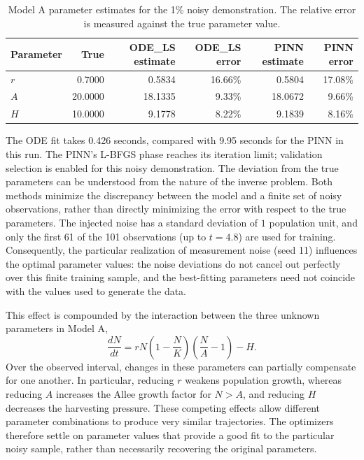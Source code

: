 \begin{table}[ht]
\centering
\caption{Model A parameter estimates for the 1\% noisy demonstration. The
relative error is measured against the true parameter value.}
\label{tab:wp05_noisy_demo}
\small
\begin{tabular}{lrrrrr}
\toprule
\textbf{Parameter} & \textbf{True} & \textbf{ODE\_LS estimate} & \textbf{ODE\_LS error} & \textbf{PINN estimate} & \textbf{PINN error}\\
\midrule
$r$ & 0.7000 & 0.5834 & 16.66\% & 0.5804 & 17.08\%\\
$A$ & 20.0000 & 18.1335 & 9.33\% & 18.0672 & 9.66\%\\
$H$ & 10.0000 & 9.1778 & 8.22\% & 9.1839 & 8.16\%\\
\bottomrule
\end{tabular}
\end{table}

The ODE fit takes 0.426 seconds, compared with 9.95 seconds for
the PINN in this run. The PINN's L-BFGS phase reaches its iteration limit;
validation selection is enabled for this noisy demonstration. The deviation from the true parameters can be understood from the
nature of the inverse problem. Both methods minimize the discrepancy
between the model and a finite set of noisy observations, rather than
directly minimizing the error with respect to the true parameters.
The injected noise has a standard deviation of $1$ population unit,
and only the first 61 of the 101 observations (up to $t=4.8$) are
used for training. Consequently, the particular realization of
measurement noise (seed 11) influences the optimal parameter values:
the noise deviations do not cancel out perfectly over this finite
training sample, and the best-fitting parameters need not coincide
with the values used to generate the data.

This effect is compounded by the interaction between the three
unknown parameters in Model A,
\[
\frac{dN}{dt}
=
rN\left(1-\frac{N}{K}\right)
\left(\frac{N}{A}-1\right)-H.
\]
Over the observed interval, changes in these parameters can partially
compensate for one another. In particular, reducing $r$ weakens
population growth, whereas reducing $A$ increases the Allee growth
factor for $N>A$, and reducing $H$ decreases the harvesting pressure.
These competing effects allow different parameter combinations to
produce very similar trajectories. The optimizers therefore settle
on parameter values that provide a good fit to the particular noisy
sample, rather than necessarily recovering the original parameters.

